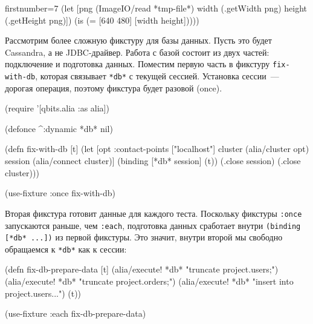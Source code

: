 \else

\begin{english}
  \begin{clojure/lines*}{firstnumber=7}
    (let [png (ImageIO/read *tmp-file*)
          width (.getWidth png)
          height (.getHeight png)])
    (is (= [640 480] [width height]))))
  \end{clojure/lines*}
\end{english}
\fi



Рассмотрим более сложную фикстуру для базы данных. Пусть это будет Cassandra, а
не JDBC-драйвер. Работа с базой состоит из двух частей: подключение и подготовка
данных. Поместим первую часть в фикстуру \verb|fix-with-db|, которая связывает
\verb|*db*| с текущей сессией. Установка сессии~--- дорогая операция, поэтому
фикстура будет разовой (once).

\begin{english}
  \begin{clojure}
(require '[qbits.alia :as alia])

(defonce ^:dynamic *db* nil)

(defn fix-with-db [t]
  (let [opt {:contact-points ["localhost"]}
        cluster (alia/cluster opt)
        session (alia/connect cluster)]
    (binding [*db* session]
      (t))
    (.close session)
    (.close cluster)))

(use-fixture :once fix-with-db)
  \end{clojure}
\end{english}

Вторая фикстура готовит данные для каждого теста. Поскольку фикстуры
\verb|:once| запускаются раньше, чем \verb|:each|, подготовка данных сработает
внутри \verb|(binding [*db* ...])| из первой фикстуры. Это значит, внутри второй
мы свободно обращаемся к \verb|*db*| как к сессии:


\ifnarrow

\begin{english}
  \begin{clojure}
(defn fix-db-prepare-data [t]
  (alia/execute! *db*
    "truncate project.users;")
  (alia/execute! *db*
    "truncate project.orders;")
  (alia/execute! *db*
    "insert into project.users...")
  (t))

(use-fixture :each fix-db-prepare-data)
  \end{clojure}
\end{english}

